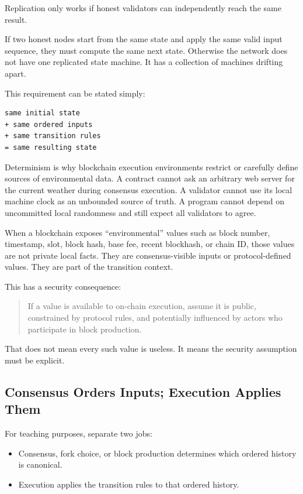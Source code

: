 Replication only works if honest validators can independently reach the
same result.

If two honest nodes start from the same state and apply the same valid
input sequence, they must compute the same next state. Otherwise the
network does not have one replicated state machine. It has a collection
of machines drifting apart.

This requirement can be stated simply:

\begin{lstlisting}
same initial state
+ same ordered inputs
+ same transition rules
= same resulting state
\end{lstlisting}

Determinism is why blockchain execution environments restrict or
carefully define sources of environmental data. A contract cannot ask an
arbitrary web server for the current weather during consensus execution.
A validator cannot use its local machine clock as an unbounded source of
truth. A program cannot depend on uncommitted local randomness and still
expect all validators to agree.

When a blockchain exposes ``environmental'' values such as block number,
timestamp, slot, block hash, base fee, recent blockhash, or chain ID,
those values are not private local facts. They are consensus-visible
inputs or protocol-defined values. They are part of the transition
context.

This has a security consequence:

\begin{quote}
If a value is available to on-chain execution, assume it is public,
constrained by protocol rules, and potentially influenced by actors who
participate in block production.
\end{quote}

That does not mean every such value is useless. It means the security
assumption must be explicit.

\subsection{Consensus Orders Inputs; Execution Applies Them}

For teaching purposes, separate two jobs:

\begin{itemize}
\tightlist
\item
  Consensus, fork choice, or block production determines which ordered
  history is canonical.
\item
  Execution applies the transition rules to that ordered history.
\end{itemize}

